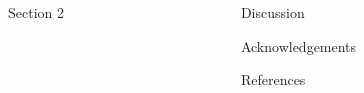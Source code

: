 \documentclass[t, final, 32pt]{beamer}
\begin{document}
\begin{frame}{}
\begin{center}
\begin{columns}[t]
\begin{column}{.36\linewidth}
\begin{block}{Section 2}
  \blindtext
\end{block}

\end{column}


\begin{column}{.3\linewidth}

\begin{block}{Discussion}
  \blindtext
\end{block}

\begin{block}{Acknowledgements}
  \blinditemize
\end{block}

\begin{block}{References}
  \blinditemize
\end{block}

\end{column}

\end{columns}
\vfill

\end{center}
\end{frame}
\end{document}
